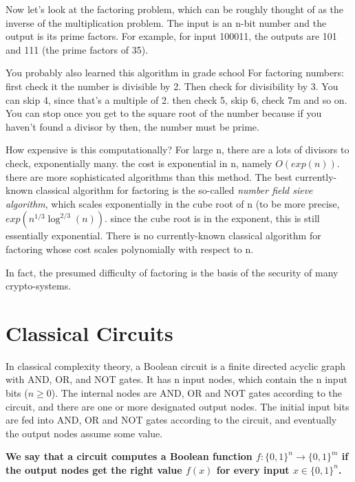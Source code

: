 Now let's look at the factoring problem, which can be roughly thought of as the inverse of the multiplication problem. The input is an n-bit number and the output is its prime factors. For example, for input 100011, the outputs are 101 and 111 (the prime factors of 35).

You probably also learned this algorithm in grade school For factoring numbers: first check it the number is divisible by 2. Then check for divisibility by 3. You can skip 4, since that's a multiple of 2. then check 5, skip 6, check 7m and so on. You can stop once you get to the square root of the number because if you haven't found a divisor by then, the number must be prime.

How expensive is this computationally? For large n, there are a lots of divisors to check, exponentially many. the cost is exponential in n, namely $O(exp(n))$. there are more sophisticated algorithms than this method. The best currently-known classical algorithm for factoring is the so-called \textit{number field sieve algorithm}, which scales exponentially in the cube root of n (to be more precise, $exp(n^{1/3}\log^{2/3}(n))$. since the cube root is in the exponent, this is still essentially exponential. There is no currently-known classical algorithm for factoring whose cost scales polynomially with respect to n.

In fact, the presumed difficulty of factoring is the basis of the security of many crypto-systems.

\section{Classical Circuits}
In classical complexity theory, a Boolean circuit is a finite directed acyclic graph with AND, OR, and NOT gates. It has n input nodes, which contain the n input bits ($n\geq 0$). The internal nodes are AND, OR and NOT gates according to the circuit, and there are one or more designated output nodes. The initial input bits are fed into AND, OR and NOT gates according to the circuit, and eventually the output nodes assume some value.

\textbf{We say that a circuit computes a Boolean function $f:\{0,1\}^n \rightarrow \{0,1\}^m$ if the output nodes get the right value $f(x)$ for every input $x \in \{0,1\}^n$.}

